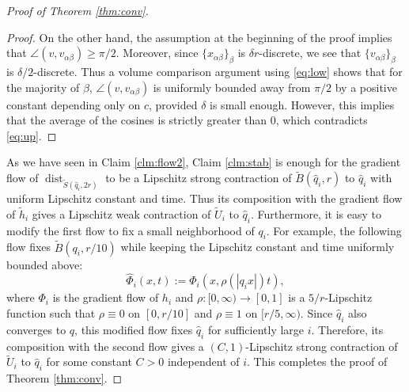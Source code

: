 \documentclass[a4paper,12pt]{amsart}
\theoremstyle{plain}
\theoremstyle{definition}
\numberwithin{thm}{section}
\numberwithin{equation}{section}
\DeclareMathOperator{\dist}{dist}
\begin{document}
\begin{proof}[Proof of Theorem \ref{thm:conv}]
\begin{proof}
On the other hand, the assumption at the beginning of the proof implies that $\angle(v,v_{\alpha\beta})\ge\pi/2$.
Moreover, since $\{x_{\alpha\beta}\}_{\beta}$ is $\delta r$-discrete, we see that $\{v_{\alpha\beta}\}_\beta$ is $\delta/2$-discrete.
Thus a volume comparison argument using \eqref{eq:low} shows that for the majority of $\beta$, $\angle(v,v_{\alpha\beta})$ is uniformly bounded away from $\pi/2$ by a positive constant depending only on $c$, provided $\delta$ is small enough. 
However, this implies that the average of the cosines is strictly greater than $0$, which contradicts \eqref{eq:up}.
\end{proof}

As we have seen in Claim \ref{clm:flow2}, Claim \ref{clm:stab} is enough for the gradient flow of $\dist_{\tilde S(\hat q_i,2r)}$ to be a Lipschitz strong contraction of $\tilde B(\hat q_i,r)$ to $\hat q_i$ with uniform Lipschitz constant and time.
Thus its composition with the gradient flow of $\tilde h_i$ gives a Lipschitz weak contraction of $\tilde U_i$ to $\hat q_i$.
Furthermore, it is easy to modify the first flow to fix a small neighborhood of $q_i$.
For example, the following flow fixes $\tilde B(q_i,r/10)$ while keeping the Lipschitz constant and time uniformly bounded above:
\[\hat \Phi_i(x,t):=\Phi_i(x,\rho(|q_ix|)t),\]
where $\Phi_i$ is the gradient flow of $h_i$ and $\rho:[0,\infty)\to[0,1]$ is a $5/r$-Lipschitz function such that $\rho\equiv0$ on $[0,r/10]$ and $\rho\equiv1$ on $[r/5,\infty)$.
Since $\hat q_i$ also converges to $q$, this modified flow fixes $\hat q_i$ for sufficiently large $i$.
Therefore, its composition with the second flow gives a $(C,1)$-Lipschitz strong contraction of $\tilde U_i$ to $\hat q_i$ for some constant $C>0$ independent of $i$.
This completes the proof of Theorem \ref{thm:conv}.
\end{proof}
\end{document}
